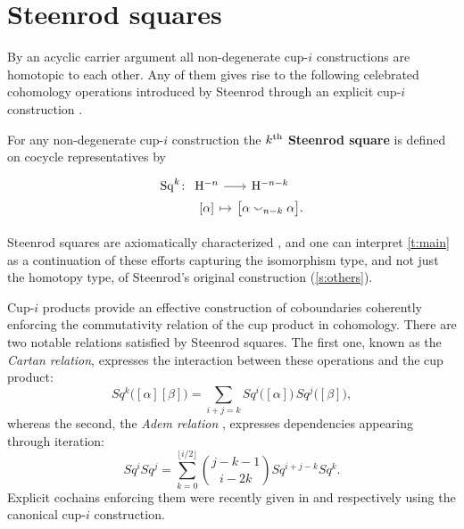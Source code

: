 
\section{Steenrod squares} \label{s:squares}

By an acyclic carrier argument \cite{eilenberg1953acyclic} all non-degenerate cup-$i$ constructions are homotopic to each other.
Any of them gives rise to the following celebrated cohomology operations introduced by Steenrod through an explicit cup-$i$ construction \cite{steenrod1947products}.

\begin{definition}
	For any non-degenerate cup-$i$ construction the \textbf{$k^{\mathrm{th}}$ Steenrod square} is defined on cocycle representatives by
	\[
	\begin{tikzcd} [column sep=tiny, row sep=0]
	\Sq^k \colon &[-10pt] \rH^{-n} \arrow[r] & \rH^{-n-k} \\
	& {[\alpha]} \arrow[r, mapsto] & \big[ \alpha \cup_{n-k} \alpha \big].
	\end{tikzcd}
	\]
\end{definition}

Steenrod squares are axiomatically characterized \cite{steenrod1962cohomology}, and one can interpret \cref{t:main} as a continuation of these efforts capturing the isomorphism type, and not just the homotopy type, of Steenrod's original construction (\cref{s:others}).

\begin{remark}[Relations]
	Cup-$i$ products provide an effective construction of coboundaries coherently enforcing the commutativity relation of the cup product in cohomology.
	There are two notable relations satisfied by Steenrod squares.
	The first one, known as the \textit{Cartan relation}, expresses the interaction between these operations and the cup product:
	\begin{equation*}
	Sq^k \big( [\alpha] [\beta] \big) = \sum_{i+j=k} Sq^i \big([\alpha]\big)\, Sq^j \big([\beta]\big),
	\end{equation*}
	whereas the second, the \textit{Adem relation} \cite{adem1952iteration}, expresses dependencies appearing through iteration:
	\begin{equation*}
	Sq^i Sq^j = \sum_{k=0}^{\lfloor i/2 \rfloor} \binom{j-k-1}{i-2k} Sq^{i+j-k} Sq^k.
	\end{equation*}
	Explicit cochains enforcing them were recently given in \cite{medina2020cartan} and \cite{medina2021adem} respectively using the canonical cup-$i$ construction.
\end{remark}

